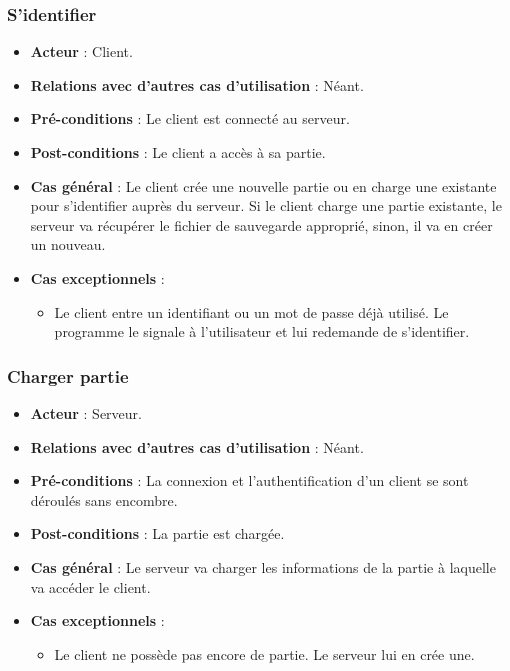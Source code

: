 \documentclass[a4paper,titlepage]{scrreprt}
\begin{document}
    \subsubsection{S'identifier}
      \begin{itemize}
        \item \textbf{Acteur} : Client.
        \item \textbf{Relations avec d'autres cas d'utilisation}  : Néant.
        \item \textbf{Pré-conditions} : Le client est connecté au serveur.
        \item \textbf{Post-conditions} : Le client a accès à sa partie.
        \item \textbf{Cas général} : Le client crée une nouvelle \gls{partie} ou en charge une existante pour s’identifier auprès du serveur. Si le client charge une partie existante, le serveur va récupérer le fichier de sauvegarde approprié, sinon, il va en créer un nouveau.
        \item \textbf{Cas exceptionnels} : 
         \begin{itemize}
            \item Le client entre un identifiant ou un mot de passe déjà utilisé. Le programme le signale à l'utilisateur et lui redemande de s'identifier.
          \end{itemize}
      \end{itemize}
    \subsubsection{Charger partie}
      \begin{itemize}
        \item \textbf{Acteur}  : Serveur.
        \item \textbf{Relations avec d'autres cas d'utilisation}  : Néant.
        \item \textbf{Pré-conditions} : La connexion et l'authentification d'un client se sont déroulés sans encombre.
        \item \textbf{Post-conditions} : La partie est chargée.
        \item \textbf{Cas général} : Le serveur va charger les informations de la partie à laquelle va accéder le client.
        \item \textbf{Cas exceptionnels} : 
        \begin{itemize}
            \item Le client ne possède pas encore de partie. Le serveur lui en crée une.
          \end{itemize}
      \end{itemize}
\end{document}
